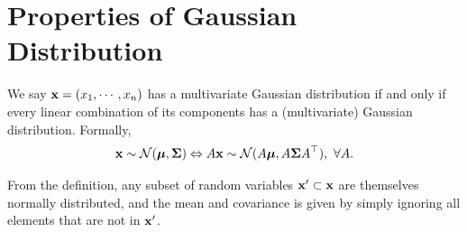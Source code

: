 \section{Properties of Gaussian Distribution}
\begin{definition}
 We say $\mathbf{x} = (x_1,\cdots, x_n)$ has a multivariate Gaussian distribution if and only if every linear combination of its components has a (multivariate) Gaussian distribution. Formally,
$$
\mathbf{x} \sim \mathcal{N}(\boldsymbol{\mu}, \mathbf{\Sigma}) \Leftrightarrow A \mathbf{x} \sim \mathcal{N}(A\boldsymbol{\mu}, A \mathbf{\Sigma} A^\top), \ \forall A.
$$
\end{definition}

\begin{property}
	From the definition, any subset of random variables $\mathbf{x}' \subset \mathbf{x}$ are themselves normally distributed, and the mean and covariance is given by simply ignoring all elements that are not in $\mathbf{x}'$.
\end{property}

